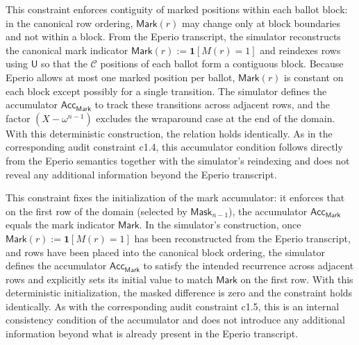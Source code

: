 
This constraint enforces contiguity of marked positions within each ballot block: in the canonical row ordering,
$\mathsf{Mark}(r)$ may change only at block boundaries and not within a block. From the Eperio transcript, the simulator
reconstructs the canonical mark indicator $\mathsf{Mark}(r):=\mathbf{1}[M(r)=1]$ and reindexes rows using $\mathsf{U}$ so
that the $\mathcal{C}$ positions of each ballot form a contiguous block. Because Eperio allows at most one marked
position per ballot, $\mathsf{Mark}(r)$ is constant on each block except possibly for a single transition. The simulator
defines the accumulator $\mathsf{Acc}_{\mathsf{Mark}}$ to track these transitions across adjacent rows, and the factor
$(X-\omega^{n-1})$ excludes the wraparound case at the end of the domain. With this deterministic construction, the
relation holds identically. As in the corresponding audit constraint c1.4, this accumulator condition follows directly
from the Eperio semantics together with the simulator’s reindexing and does not reveal any additional information beyond
the Eperio transcript.


This constraint fixes the initialization of the mark accumulator: it enforces that on the first row of the domain
(selected by $\mathsf{Mask}_{n-1}$), the accumulator $\mathsf{Acc}_{\mathsf{Mark}}$ equals the mark indicator
$\mathsf{Mark}$. In the simulator’s construction, once $\mathsf{Mark}(r):=\mathbf{1}[M(r)=1]$ has been reconstructed from
the Eperio transcript, and rows have been placed into the canonical block ordering, the simulator defines the accumulator
$\mathsf{Acc}_{\mathsf{Mark}}$ to satisfy the intended recurrence across adjacent rows and explicitly sets its initial
value to match $\mathsf{Mark}$ on the first row. With this deterministic initialization, the masked difference is zero and
the constraint holds identically. As with the corresponding audit constraint c1.5, this is an internal consistency
condition of the accumulator and does not introduce any additional information beyond what is already present in the
Eperio transcript.


